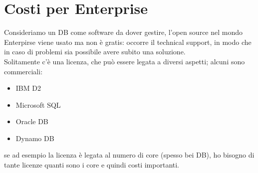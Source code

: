 \documentclass{article}
\begin{document}
\section{Costi per Enterprise}
Consideriamo un DB come software da dover gestire, l'open source nel mondo Enterpirse viene usato ma non è gratis: occorre il technical support, in modo che in caso di problemi sia possibile avere subito una soluzione.\\ Solitamente c'è una licenza, che può essere legata a diversi aspetti; alcuni sono commerciali:
\begin{itemize}
\item IBM D2
\item Microsoft SQL
\item Oracle DB
\item Dynamo DB
\end{itemize}
se ad esempio la licenza è legata al numero di core (spesso bei DB), ho bisogno di tante licenze quanti sono i core e quindi costi importanti.
\end{document}
